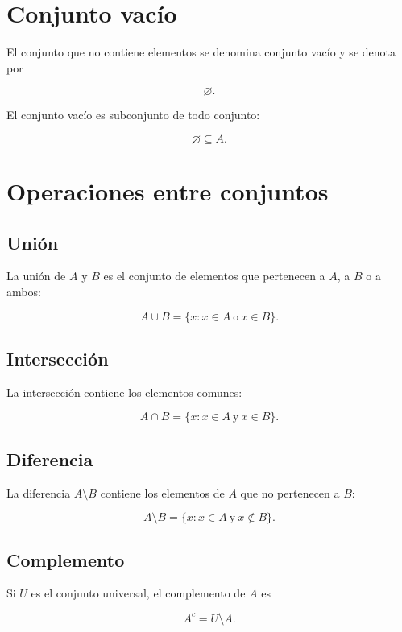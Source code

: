 \documentclass[
  spanish,
  11pt,
  letterpaper,
  DIV=11,
  numbers=noendperiod]{scrreprt}
\theoremstyle{definition}
\theoremstyle{plain}
\theoremstyle{definition}
\theoremstyle{remark}
\begin{document}
\section{Conjunto vacío}\label{conjunto-vacuxedo}

El conjunto que no contiene elementos se denomina conjunto vacío y se
denota por

\[
\varnothing.
\]

El conjunto vacío es subconjunto de todo conjunto:

\[
\varnothing\subseteq A.
\]

\section{Operaciones entre conjuntos}\label{operaciones-entre-conjuntos}

\subsection{Unión}\label{uniuxf3n}

La unión de \(A\) y \(B\) es el conjunto de elementos que pertenecen a
\(A\), a \(B\) o a ambos:

\[
A\cup B
=
\{x:x\in A\ \text{o}\ x\in B\}.
\]

\subsection{Intersección}\label{intersecciuxf3n}

La intersección contiene los elementos comunes:

\[
A\cap B
=
\{x:x\in A\ \text{y}\ x\in B\}.
\]

\subsection{Diferencia}\label{diferencia}

La diferencia \(A\setminus B\) contiene los elementos de \(A\) que no
pertenecen a \(B\):

\[
A\setminus B
=
\{x:x\in A\ \text{y}\ x\notin B\}.
\]

\subsection{Complemento}\label{complemento}

Si \(U\) es el conjunto universal, el complemento de \(A\) es

\[
A^{c}=U\setminus A.
\]
\end{document}
